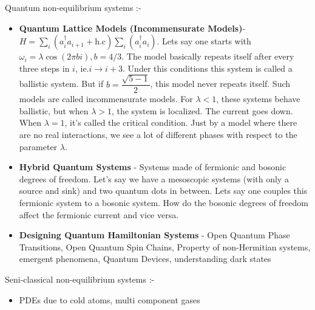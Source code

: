 \documentclass[a4paper,11pt]{article}
\begin{document}
Quantum non-equilibrium systems :-
\begin{itemize}
	\item \textbf{Quantum Lattice Models (Incommensurate Models)}- $ H = \sum_i (a_i^\dagger a_{i+1} + \text{h.c}) \sum_i (a_i^\dagger a_{i}) $. Lets say one starts with $ \omega_i = \lambda \cos(2 \pi b i), b = 4/3 $. The model basically repeats itself after every three steps in $ i $, ie.$ i \rightarrow i + 3 $. Under this conditions this system is called a ballistic system. But if $ b = \dfrac{\sqrt{5 -1}}{2} $, this model never repeats itself. Such models are called incommensurate models. For $ \lambda < 1 $, these systems behave ballistic, but when $ \lambda > 1 $, the system is localized. The current goes down. When $ \lambda = 1 $, it's called the critical condition. Just by a model where there are no real interactions, we see a lot of different phases with respect to the parameter $ \lambda $.
	\item \textbf{Hybrid Quantum Systems} - Systems made of fermionic and bosonic degrees of freedom. Let's say we have a mesoscopic systems (with only a source and sink) and two quantum dots in between. Lets say one couples this fermionic system to a bosonic system. How do the bosonic degrees of freedom affect the fermionic current and vice versa.
	\item \textbf{Designing Quantum Hamiltonian Systems} - Open Quantum Phase Transitions, Open Quantum Spin Chains, Property of non-Hermitian systems, emergent phenomena, Quantum Devices, understanding dark states
\end{itemize}

Seni-classical non-equilibrium systems :-
\begin{itemize}
	\item PDEs due to cold atoms, multi component gases
\end{itemize}
\end{document}
